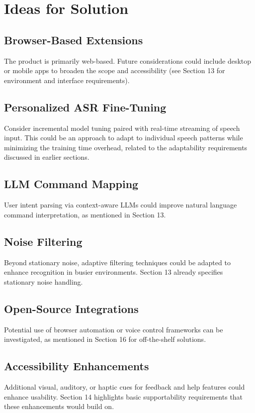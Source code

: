 \documentclass[11pt]{article}
\begin{document}
\section{Ideas for Solution}

\subsection{Browser-Based Extensions}
The product is primarily web-based. Future considerations could include desktop or mobile apps to broaden the scope and accessibility (see Section 13 for environment and interface requirements).

\subsection{Personalized ASR Fine-Tuning}
Consider incremental model tuning paired with real-time streaming of speech input. This could be an approach to adapt to individual speech patterns while minimizing the training time overhead, related to the adaptability requirements discussed in earlier sections.

\subsection{LLM Command Mapping}
User intent parsing via context-aware LLMs could improve natural language command interpretation, as mentioned in Section 13.

\subsection{Noise Filtering}
Beyond stationary noise, adaptive filtering techniques could be adapted to enhance recognition in busier environments. Section 13 already specifies stationary noise handling.

\subsection{Open-Source Integrations}
Potential use of browser automation or voice control frameworks can be investigated, as mentioned in Section 16 for off-the-shelf solutions.

\subsection{Accessibility Enhancements}
Additional visual, auditory, or haptic cues for feedback and help features could enhance usability. Section 14 highlights basic supportability requirements that these enhancements would build on.
\end{document}
